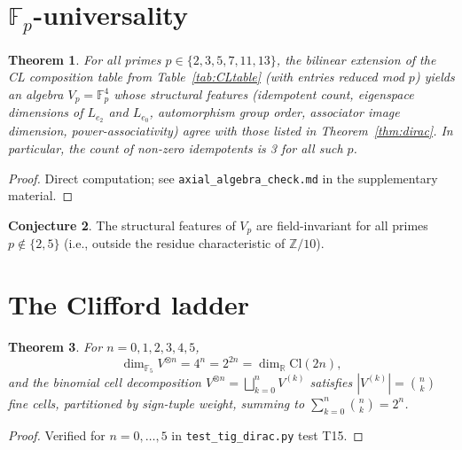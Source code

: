 \documentclass[11pt]{amsart}
\theoremstyle{plain}
\newtheorem{theorem}{Theorem}[section]
\theoremstyle{definition}
\newtheorem{conjecture}[theorem]{Conjecture}
\theoremstyle{remark}
\newcommand{\Z}{\mathbb{Z}}
\newcommand{\F}{\mathbb{F}}
\newcommand{\R}{\mathbb{R}}
\newcommand{\Cl}{\mathrm{Cl}}
\begin{document}
\section{$\F_p$-universality}
\label{sec:fpuniv}

\begin{theorem}\label{thm:fpuniv}
For all primes $p \in \{2, 3, 5, 7, 11, 13\}$, the bilinear extension of
the CL composition table from Table~\ref{tab:CLtable} (with entries reduced
mod $p$) yields an algebra $V_p = \F_p^4$ whose structural features (idempotent
count, eigenspace dimensions of $L_{e_2}$ and $L_{e_0}$, automorphism group
order, associator image dimension, power-associativity) agree with those
listed in Theorem~\ref{thm:dirac}. In particular, the count of non-zero
idempotents is 3 for all such $p$.
\end{theorem}

\begin{proof}
Direct computation; see \texttt{axial\_algebra\_check.md} in the supplementary
material.
\end{proof}

\begin{conjecture}\label{conj:fpuniv-allp}
The structural features of $V_p$ are field-invariant for all primes $p \notin \{2,5\}$
(i.e., outside the residue characteristic of $\Z/10$).
\end{conjecture}

\section{The Clifford ladder}
\label{sec:clifford}

\begin{theorem}\label{thm:clifford}
For $n = 0, 1, 2, 3, 4, 5$,
\[
\dim_{\F_5} V^{\otimes n} = 4^n = 2^{2n} = \dim_\R \Cl(2n),
\]
and the binomial cell decomposition $V^{\otimes n} = \bigsqcup_{k=0}^n V^{(k)}$
satisfies $|V^{(k)}| = \binom{n}{k}$ fine cells, partitioned by sign-tuple
weight, summing to $\sum_{k=0}^n \binom{n}{k} = 2^n$.
\end{theorem}

\begin{proof}
Verified for $n=0,\ldots,5$ in \texttt{test\_tig\_dirac.py} test T15.
\end{proof}
\end{document}
